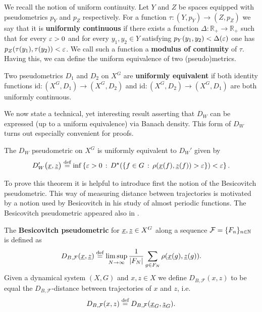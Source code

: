 We recall the notion of uniform continuity. 
%
Let $Y$ and $Z$ be spaces equipped with pseudometrics $p_Y$ and $p_Z$ respectively.
%
For a function $\tau:(Y,p_Y)\to(Z,p_Z)$ we say that it is {\bf uniformly continuous} if there exists a function $\Delta\colon \mathbb R_+\to\mathbb R_+$ such that for every $\varepsilon>0$
and for every $y_1,y_2\in Y$ satisfying $p_Y(y_1,y_2)<\Delta(\varepsilon)$ one has $p_Z(\tau(y_1), \tau(y_2))<\varepsilon$.
%
We call such a function a {\bf modulus of continuity} of $\tau$.
%
Having this, we can define the uniform equivalence of two (pseudo)metrics.
 
 \begin{defn}
Two pseudometrics $D_1$ and $D_2$ on $X^G$ are {\bf uniformly equivalent} if both identity functions $\textrm{id}\colon (X^G, D_1)\to (X^G,D_2)$ and $\textrm{id}\colon (X^G, D_2)\to (X^G,D_1)$ are both uniformly continuous.
\end{defn}


\noindent We now state a technical, yet interesting result asserting that $D_W$ can be expressed (up to a uniform equivalence) via Banach density. This form of $D_W$ turns out especially convenient for proofs.
\begin{thm}\label{uniEquivDw}
The $D_W$ pseudometric on $X^G$ is uniformly equivalent to $D_W'$ given by 
\[
D_W'\big(\underline{x},\underline{z}\big)\stackrel{\textup{def}}{=}\inf\left\{\varepsilon>0\,:\,D^\star(\{f\in G\,:\,\rho(\underline{x}(f), \underline{z}(f))>\varepsilon\})<\varepsilon\right\}.
\]
\end{thm}

\noindent
To prove this theorem it is helpful to introduce first the notion of the Besicovitch pseudometric. This way of measuring distance between trajectories is motivated by a notion used by Besicovitch in his study of almost periodic functions. The Besicovitch pseudometric appeared also in \cite{Auslander59,Fomin51,FGJ16,Oxtoby52}.

\begin{defn}
The {\bf Besicovitch pseudometric} for $\underline{x},\underline{z}\in X^{G}$ along a \Folner sequence $\mathcal F=\{F_n\}_{n\in\mathbb{N}}$ is defined as
	\[
D_{B,\mathcal F}(\underline x,\underline z)\stackrel{\textup{def}}{=}\limsup_{N\to\infty}\frac{1}{|F_N|}\sum_{g\in F_N}\rho(\underline{x}(g),\underline{z}(g)).
	\]
Given a dynamical system $(X,G)$ and $x,z\in X$ we define $D_{B,\mathcal F}(x,z)$ to be equal the $D_{B,\mathcal F}$-distance between trajectories of $x$ and $z$, i.e.
\[
D_{B,\mathcal F}(x,z) \stackrel{\textup{def}}{=} D_{B,\mathcal F}(\underline{x}_G,\underline{z}_G).
\]
\end{defn}

